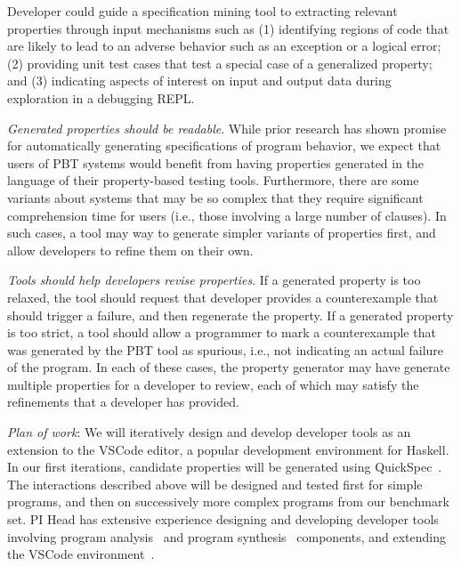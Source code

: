 Developer could guide a specification mining tool to extracting relevant
properties through input mechanisms such as (1) identifying regions of code that
are likely to lead to an adverse behavior such as an exception or a logical
error; (2) providing unit test cases that test a special case of a generalized
property; and (3) indicating aspects of interest on input and output data during
exploration in a debugging REPL.

\textit{Generated properties should be \emph{readable}}. While prior research
has shown promise for automatically generating specifications of program
behavior, we expect that users of PBT systems would benefit from having
properties generated in the language of their property-based testing tools.
Furthermore, there are some variants about systems that may be so complex that
they require significant comprehension time for users (i.e., those involving a
large number of clauses). In such cases, a tool may way to generate simpler
variants of properties first, and allow developers to refine them on their own.

\textit{Tools should help developers \emph{revise} properties}. If a generated
property is too relaxed, the tool should request that developer provides a
counterexample that should trigger a failure, and then regenerate the property.
If a generated property is too strict, a tool should allow a programmer to mark
a counterexample that was generated by the PBT tool as spurious, i.e., not
indicating an actual failure of the program. In each of these cases, the
property generator may have generate multiple properties for a developer to
review, each of which may satisfy the refinements that a developer has provided.

\textit{Plan of work}: We will iteratively design and develop developer tools as
an extension to the VSCode editor, a popular development environment for
Haskell. In our first iterations, candidate properties will be generated using
QuickSpec~\cite{claessen2010quickspec}. The interactions described above will be
designed and tested first for simple programs, and then on successively more
complex programs from our benchmark set. PI Head has extensive experience
designing and developing developer tools involving program
analysis~\cite{head2018interactive,head2019managing} and program
synthesis~\cite{head2017writing} components, and extending the VSCode
environment~\cite{head2020composing}.   


